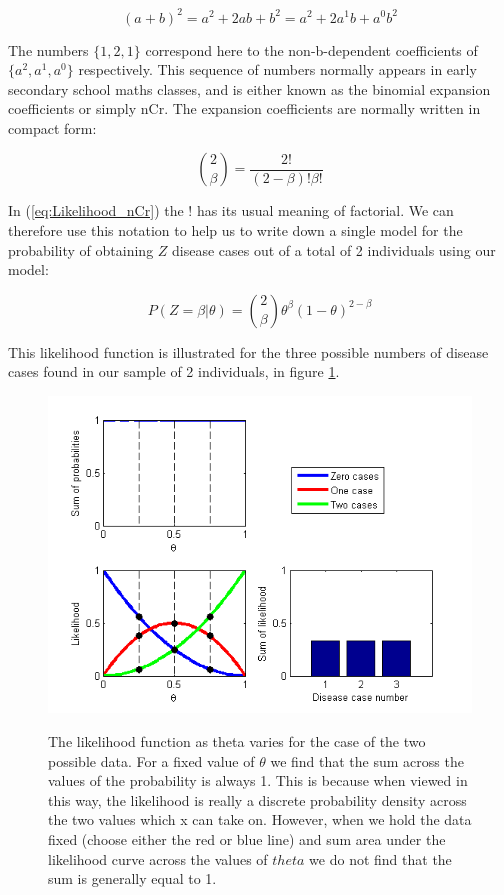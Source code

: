 \documentclass[11pt,fullpage]{book}
\begin{document}
\begin{equation}\label{eq:Likelihood_quadratic}
(a+b)^2 = a^2 + 2ab + b^2 = a^2 + 2a^1b + a^0b^2
\end{equation}

The numbers $\{1,2,1\}$ correspond here to the non-b-dependent coefficients of $\{a^2,a^1,a^0\}$ respectively. This sequence of numbers normally appears in early secondary school maths classes, and is either known as the binomial expansion coefficients or simply nCr. The expansion coefficients are normally written in compact form:

\begin{equation}\label{eq:Likelihood_nCr}
{2 \choose \beta} = \frac{2!}{(2-\beta)!\beta!}
\end{equation}

In (\ref{eq:Likelihood_nCr}) the $!$ has its usual meaning of factorial. We can therefore use this notation to help us to write down a single model for the probability of obtaining $Z$ disease cases out of a total of 2 individuals using our model:

\begin{equation}\label{eq:Likelihood_binomialTwoFull}
P(Z=\beta|\theta) = {2 \choose \beta} \theta^\beta (1-\theta)^{2-\beta}
\end{equation}

This likelihood function is illustrated for the three possible numbers of disease cases found in our sample of 2 individuals, in figure \ref{fig:Likelihood_binomial}.

\begin{figure}
\centering
\scalebox{0.75} 
{\includegraphics{likelihood_binomial.png}}
\caption{The likelihood function as theta varies for the case of the two possible data. For a fixed value of $\theta$ we find that the sum across the values of the probability is always 1. This is because when viewed in this way, the likelihood is really a discrete probability density across the two values which x can take on. However, when we hold the data fixed (choose either the red or blue line) and sum area under the likelihood curve across the values of $theta$ we do not find that the sum is generally equal to 1. }\label{fig:Likelihood_binomial}
\end{figure}
\end{document}
